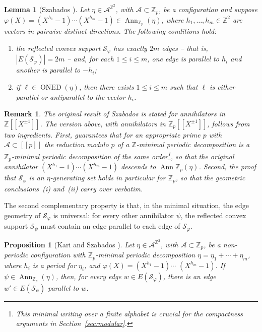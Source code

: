 \documentclass[12pt]{amsart}
\numberwithin{equation}{section}
\newtheorem{proposition}[theorem]{Proposition}
\newtheorem{lemma}[theorem]{Lemma}
\newtheorem{remark}[theorem]{Remark}
\DeclareMathOperator{\Ann}{Ann}
\DeclareMathOperator{\nexpd}{ONED}
\newcommand{\bb}[1]{\mathbb{#1}}
\newcommand{\llb}{[\![}
\newcommand{\rrb}{]\!]}
\begin{document}
\begin{lemma}[Szabados \cite{Szabados18}]\label{lem_periods_annihilator}
Let $\eta \in \mathcal{A}^{\bb{Z}^2}$, with \(\mathcal{A} \subset \bb{Z}_p\), be a configuration and suppose $\varphi(X) = (X^{h_1}-1) \cdots (X^{h_m}-1) \in \Ann_{\bb{Z}_p}(\eta)$, where \(h_1, \ldots, h_m \in \bb{Z}^2\) are vectors in pairwise distinct directions. 
The following conditions hold:
\begin{enumerate}[label=(\roman*)]\setlength{\itemsep}{5pt}
	\item the reflected convex support $\mathcal{S}_{\varphi} $ has exactly $ 2m $ edges -- that is,
    $ |E(\mathcal{S}_{\varphi})| = 2m $ -- and, for each \(1 \leq i \leq m\), one edge is parallel to \(h_i\) and another is parallel to \(-h_i\);
	\item if $\pmb{\ell} \in \nexpd(\eta)$, then there exists \(1 \leq i \leq m\) such that \(\pmb{\ell}\) is either parallel or antiparallel to the vector $h_i$.
\end{enumerate} 
\end{lemma}

\begin{remark}
The original result of Szabados \cite{Szabados18} is stated for annihilators in $ \mathbb Z\llb X^{\pm1}\rrb $. The version above, with annihilators in $ \mathbb Z_p\llb X^{\pm1}\rrb $, follows from two ingredients. First, \cite[Theorem~1.5]{Colle22} guarantees that for an appropriate prime $ p $ with $ \mathcal A \subset \llb p \rrb $ the reduction modulo $ p $ of a $\mathbb{Z}$-minimal periodic decomposition is a $\mathbb{Z}_p$-minimal periodic decomposition of the same order\footnote{This
\emph{minimal writing over a finite alphabet} is crucial for the
compactness arguments in Section~\ref{sec:modular}.}, so that the original annihilator $(X^{h_1}-1)\cdots(X^{h_m}-1)$ descends to $ \Ann{\bb{Z}_p}(\eta) $. Second, the proof that $\mathcal{S}_\varphi$ is an $\eta$-generating set \cite[Lemma~2.4]{Colle22} holds in particular for $\mathbb{Z}_p$, so that the geometric conclusions~(i) and~(ii) carry over verbatim.
\end{remark}

The second complementary property is that, in the minimal situation, the edge geometry of $ \mathcal{S}_\varphi$ is universal: for every other annihilator $\psi$, the reflected convex support $ \mathcal{S}_\psi$ must contain an edge parallel to each edge of $\mathcal{S}_\varphi$.

\begin{proposition}[Kari and Szabados \cite{KariSzabados20}]\label{prop_geom_convexset}
Let $\eta \in \mathcal{A}^{\bb{Z}^2}$, with $\mathcal{A} \subset \bb{Z}_p$, be a non-periodic configuration with $\bb{Z}_p$-minimal periodic decomposition $\eta = \eta_1+\cdots+\eta_m$, where $h_i$ is a period for $\eta_i$, and $\varphi(X) = (X^{h_1}-1) \cdots$ $(X^{h_{m}}-1)$. If $\psi \in \Ann_{\bb{Z}_p}(\eta)$, then, for every edge $w \in E(\mathcal{S}_{\varphi})$, there is an edge $w' \in E(\mathcal{S}_{\psi})$ parallel to $w$.
\end{proposition}
\end{document}
